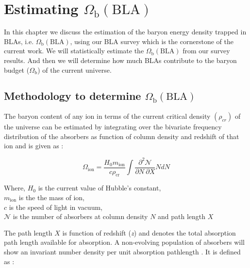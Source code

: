\chapter{Estimating $\Omega_\text{b}(\text{BLA})$} \label{ch:Omega-b}

In this chapter we discuss the estimation of the baryon energy density trapped in BLAs, i.e. $\Omega_\text{b}(\text{BLA})$, using our BLA survey which is the cornerstone of the current work. We will statistically estimate the $\Omega_\text{b}(\text{BLA})$ from our survey results. And then we will determine how much BLAs contribute to the baryon budget ($\Omega_\text{b}$) of the current universe.

\section{Methodology to determine $\Omega_\text{b}(\text{BLA})$}

The baryon content of any ion in terms of the current critical density $(\rho_{cr})$ of the universe can be estimated by integrating over the bivariate frequency distribution of the absorbers as function of column density and redshift of that ion and is given as :

\begin{equation} \label{eqn:omega_ion}
    \Omega_{\text{ion}} = \frac{H_0 m_{\text{ion}}}{c \rho_{\text{cr}}} \int \frac{\partial ^2 \mathcal{N}}{\partial N \ \partial X} N dN 
\end{equation}

\vspace*{3mm}

Where, $H_0$ is the current value of Hubble's constant, \\ \hspace*{19mm}
$m_\text{ion}$ is the the mass of ion, \\ \hspace*{19mm}
$c$ is the speed of light in vacuum, \\ \hspace*{19mm}
$\mathcal{N}$ is the number of absorbers at column density $N$ and path length $X$

\newpage

The path length $X$ is function of redshift (\emph{z}) and denotes the total absorption path length available for absorption. A non-evolving population of absorbers will show an invariant number density per unit absorption pathlength \citep{Becker-2011}. It is defined as :

